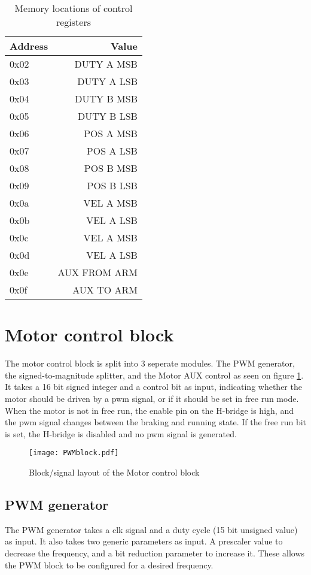 \begin{table}[htb]
\centering
\begin{tabular}{|l|r|}
\hline
Address & Value \\
\hline
0x02 & DUTY A MSB \\
0x03 & DUTY A LSB\\
0x04 & DUTY B MSB\\
0x05 & DUTY B LSB\\
0x06 & POS A MSB\\
0x07 & POS A LSB\\
0x08 & POS B MSB\\
0x09 & POS B LSB\\
0x0a & VEL A MSB\\
0x0b & VEL A LSB\\
0x0c & VEL A MSB\\
0x0d & VEL A LSB\\
0x0e & AUX FROM ARM\\
0x0f & AUX TO ARM\\
\hline 
\end{tabular}
\caption{Memory locations of control registers}
\label{tab:Memorymapping}
\end{table}


\section{Motor control block}


The motor control block is split into 3 seperate modules.
The PWM generator, the signed-to-magnitude splitter, and the Motor AUX control as seen on figure \ref{fig:pwmblock}.
It takes a 16 bit signed integer and a control bit as input, indicating whether the motor should be driven by a pwm signal, or if it should be set in free run mode. 
When the motor is not in free run, the enable pin on the H-bridge is high, and the pwm signal changes between the braking and running state. If the free run bit is set, the H-bridge is disabled and no pwm signal is generated.

\begin{figure}[htb]
\texttt{[image: PWMblock.pdf]}
\caption{Block/signal layout of the Motor control block}
\label{fig:pwmblock}
\end{figure}

\subsection{PWM generator}
The PWM generator takes a clk signal and a duty cycle (15 bit unsigned value) as input. It also takes two generic parameters as input. A prescaler value to decrease the frequency, and a bit reduction parameter to increase it. These allows the PWM block to be configured for a desired frequency.

